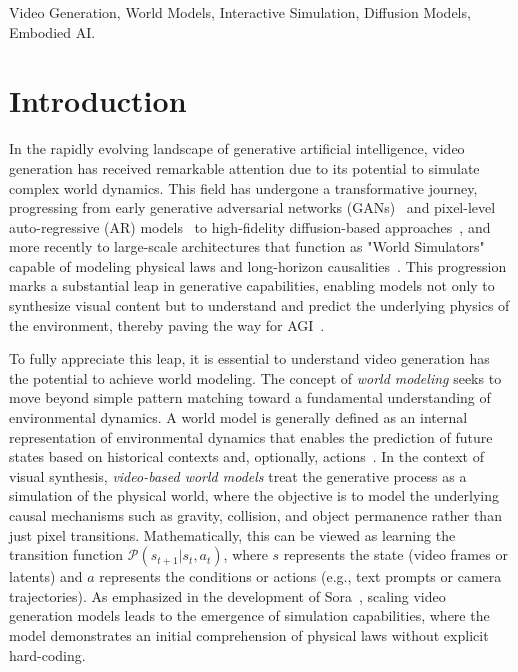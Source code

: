 \documentclass[lettersize,journal]{IEEEtran}
\begin{document}
\begin{IEEEkeywords}
Video Generation, World Models, Interactive Simulation, Diffusion Models, Embodied AI.
\end{IEEEkeywords}


\section{Introduction}

In the rapidly evolving landscape of generative artificial intelligence, video generation has received remarkable attention due to its potential to simulate complex world dynamics. This field has undergone a transformative journey, progressing from early generative adversarial networks (GANs)~\cite{goodfellow2014generative, saito2017temporal} and pixel-level auto-regressive (AR) models~\cite{kalchbrenner2017video, yan2021videogpt} to high-fidelity diffusion-based approaches~\cite{ramesh2021zero,rombach2022high,saharia2022photorealistic,ho2022video,song2020score, blattmann2023align,betker2023improving,podellsdxl,esser2024scaling}, and more recently to large-scale architectures that function as "World Simulators" capable of modeling physical laws and long-horizon causalities~\cite{videoworldsimulators2024, peebles2023scalable}. This progression marks a substantial leap in generative capabilities, enabling models not only to synthesize visual content but to understand and predict the underlying physics of the environment, thereby paving the way for AGI~\cite{ha2018world, yang2024learning}.

To fully appreciate this leap, it is essential to understand video generation has the potential to achieve world modeling. The concept of \textit{world modeling} seeks to move beyond simple pattern matching toward a fundamental understanding of environmental dynamics. A world model is generally defined as an internal representation of environmental dynamics that enables the prediction of future states based on historical contexts and, optionally, actions~\cite{ha2018world}. In the context of visual synthesis, \textit{video-based world models} treat the generative process as a simulation of the physical world, where the objective is to model the underlying causal mechanisms such as gravity, collision, and object permanence rather than just pixel transitions. Mathematically, this can be viewed as learning the transition function $\mathcal{P}(s_{t+1} | s_t, a_t)$, where $s$ represents the state (video frames or latents) and $a$ represents the conditions or actions (e.g., text prompts or camera trajectories). As emphasized in the development of {Sora}~\cite{videoworldsimulators2024}, scaling video generation models leads to the emergence of simulation capabilities, where the model demonstrates an initial comprehension of physical laws without explicit hard-coding. 
\end{document}
